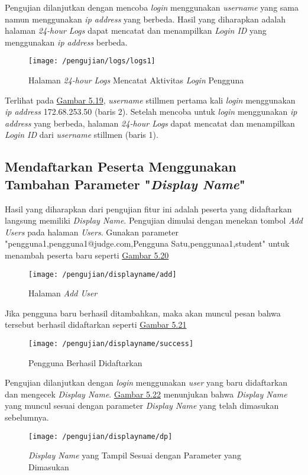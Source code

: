 	Pengujian dilanjutkan dengan mencoba \textit{login} menggunakan \textit{username} yang sama namun menggunakan \textit{ip address} yang berbeda. Hasil yang diharapkan adalah halaman \textit{24-hour Logs} dapat mencatat dan menampilkan \textit{Login ID} yang menggunakan \textit{ip address} berbeda.
	\begin{figure}[H]
		\centering  
		\texttt{[image: /pengujian/logs/logs1]}  
		\caption[Halaman \textit{24-hour Logs} Mencatat Aktivitas \textit{Login} Pengguna]{Halaman \textit{24-hour Logs} Mencatat Aktivitas \textit{Login} Pengguna} 
		\label{fig:logs1} 
	\end{figure}
	Terlihat pada \hyperref[fig:logs1]{Gambar 5.19}, \textit{username} stillmen pertama kali \textit{login} menggunakan \textit{ip address} 172.68.253.50 (baris 2). Setelah mencoba untuk \textit{login} menggunakan \textit{ip address} yang berbeda, halaman \textit{24-hour Logs} dapat mencatat dan menampilkan \textit{Login ID} dari \textit{username} stillmen (baris 1).
	
	\subsection{Mendaftarkan Peserta Menggunakan Tambahan Parameter "\textit{Display Name}"}
	Hasil yang diharapkan dari pengujian fitur ini adalah peserta yang didaftarkan langsung memiliki \textit{Display Name}. Pengujian dimulai dengan menekan tombol \textit{Add Users} pada halaman \textit{Users}. Gunakan parameter "pengguna1,pengguna1@judge.com,Pengguna Satu,penggunaa1,student" untuk menambah peserta baru seperti \hyperref[fig:useradd]{Gambar 5.20}
	\begin{figure}[H]
		\centering  
		\texttt{[image: /pengujian/displayname/add]}  
		\caption[Halaman \textit{Add User}]{Halaman \textit{Add User}} 
		\label{fig:useradd} 
	\end{figure}

	Jika pengguna baru berhasil ditambahkan, maka akan muncul pesan bahwa tersebut berhasil didaftarkan seperti \hyperref[fig:success]{Gambar 5.21}
	\begin{figure}[H]
		\centering  
		\texttt{[image: /pengujian/displayname/success]}  
		\caption[Pengguna Berhasil Didaftarkan]{Pengguna Berhasil Didaftarkan} 
		\label{fig:success} 
	\end{figure}

	Pengujian dilanjutkan dengan \textit{login} menggunakan \textit{user} yang baru didaftarkan dan mengecek \textit{Display Name}. \hyperref[fig:dp]{Gambar 5.22} menunjukan bahwa \textit{Display Name} yang muncul sesuai dengan parameter \textit{Display Name} yang telah dimasukan sebelumnya.
	\begin{figure}[H]
		\centering  
		\texttt{[image: /pengujian/displayname/dp]}  
		\caption[\textit{Display Name} yang Tampil Sesuai dengan Parameter yang Dimasukan]{\textit{Display Name} yang Tampil Sesuai dengan Parameter yang Dimasukan} 
		\label{fig:dp} 
	\end{figure}

